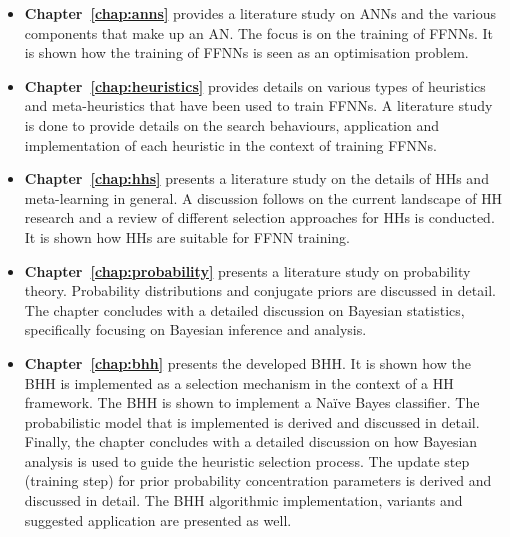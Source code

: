 \begin{itemize}
      \item
            \textbf{Chapter~\ref{chap:anns}} provides a literature study on \acp{ANN}
            and the various components that make up an \acl{AN}. The focus is on the
            training of \acp{FFNN}. It is shown how the training of \acp{FFNN} is
            seen as an optimisation problem.

      \item
            \textbf{Chapter~\ref{chap:heuristics}} provides details on various types of
            heuristics and meta-heuristics that have been used to train \acp{FFNN}. A
            literature study is done to provide details on the search behaviours, application and
            implementation of each heuristic in the context of training \acp{FFNN}.

      \item
            \textbf{Chapter~\ref{chap:hhs}} presents a literature study on the details
            of \acp{HH} and meta-learning in general. A
            discussion follows on the current landscape of \ac{HH} research and a review of different selection approaches for \acp{HH} is conducted. It is shown how \acp{HH} are suitable for \acs{FFNN} training.

      \item
            \textbf{Chapter~\ref{chap:probability}} presents a literature study on
            probability theory. Probability distributions and
            conjugate priors are discussed in detail. The chapter concludes with a
            detailed discussion on Bayesian statistics, specifically focusing on
            Bayesian inference and analysis.

      \item
            \textbf{Chapter~\ref{chap:bhh}} presents the developed \Ac{BHH}. It is shown
            how the \Ac{BHH} is implemented as a selection mechanism in the context of a
            \ac{HH} framework. The \Ac{BHH} is shown to implement a Na\"ive Bayes classifier. The probabilistic model that is
            implemented is derived and discussed in detail. Finally, the chapter
            concludes with a detailed discussion on how Bayesian analysis is used to guide the heuristic selection process.
            The update step (training step) for prior probability concentration
            parameters is derived and discussed in detail. The \Ac{BHH} algorithmic
            implementation, variants and suggested application are presented as well.


\end{itemize}
